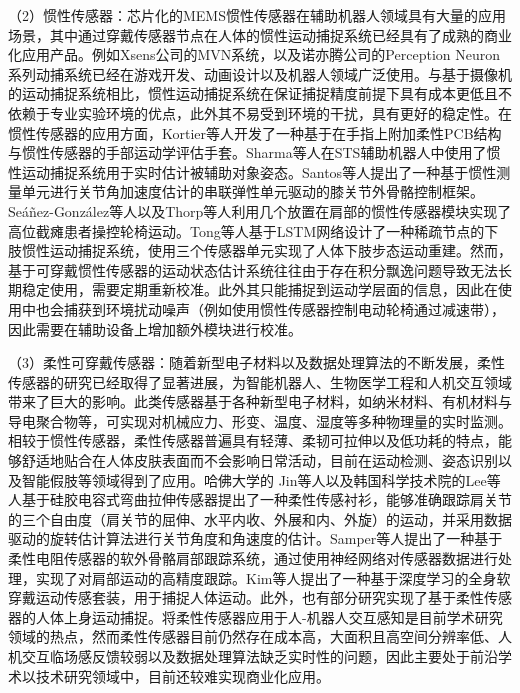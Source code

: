 （2）惯性传感器：芯片化的MEMS惯性传感器在辅助机器人领域具有大量的应用场景，其中通过穿戴传感器节点在人体的惯性运动捕捉系统已经具有了成熟的商业化应用产品。例如Xsens公司的MVN系统\cite{XsensProductsMovella}，以及诺亦腾公司的Perception Neuron系列\cite{NoitomNuoYiTengGuanWang}动捕系统已经在游戏开发、动画设计以及机器人领域广泛使用。与基于摄像机的运动捕捉系统相比，惯性运动捕捉系统在保证捕捉精度前提下具有成本更低且不依赖于专业实验环境的优点，此外其不易受到环境的干扰，具有更好的稳定性。在惯性传感器的应用方面，Kortier等人\cite{kortierAssessmentHandKinematics2014}开发了一种基于在手指上附加柔性PCB结构与惯性传感器的手部运动学评估手套。Sharma等人\cite{sharmaBiomechanicalTrajectoryOptimization2022,sharmaPhysicalHumanRobotInteraction2022}在STS辅助机器人中使用了惯性运动捕捉系统用于实时估计被辅助对象姿态。Santos等人\cite{dossantosIMUbasedTransparencyControl2022}提出了一种基于惯性测量单元进行关节角加速度估计的串联弹性单元驱动的膝关节外骨骼控制框架。Seáñez-González等人\cite{seanez-gonzalezStaticDynamicDecoding2017}以及Thorp等人\cite{thorpUpperBodyBasedPower2016d}利用几个放置在肩部的惯性传感器模块实现了高位截瘫患者操控轮椅运动。Tong等人\cite{tongLSTMBasedLowerLimbs2020}基于LSTM网络设计了一种稀疏节点的下肢惯性运动捕捉系统，使用三个传感器单元实现了人体下肢步态运动重建。然而，基于可穿戴惯性传感器的运动状态估计系统往往由于存在积分飘逸问题导致无法长期稳定使用，需要定期重新校准。此外其只能捕捉到运动学层面的信息，因此在使用中也会捕获到环境扰动噪声（例如使用惯性传感器控制电动轮椅通过减速带），因此需要在辅助设备上增加额外模块进行校准。

（3）柔性可穿戴传感器：随着新型电子材料以及数据处理算法的不断发展，柔性传感器的研究已经取得了显著进展，为智能机器人、生物医学工程和人机交互领域带来了巨大的影响。此类传感器基于各种新型电子材料，如纳米材料、有机材料与导电聚合物等，可实现对机械应力、形变、温度、湿度等多种物理量的实时监测。相较于惯性传感器，柔性传感器普遍具有轻薄、柔韧可拉伸以及低功耗的特点，能够舒适地贴合在人体皮肤表面而不会影响日常活动，目前在运动检测、姿态识别以及智能假肢等领域得到了应用。哈佛大学的 Jin等人\cite{jinSoftSensingShirt2020}以及韩国科学技术院的Lee等人\cite{leePrintableSkinAdhesive2016}基于硅胶电容式弯曲拉伸传感器提出了一种柔性传感衬衫，能够准确跟踪肩关节的三个自由度（肩关节的屈伸、水平内收、外展和内、外旋）的运动，并采用数据驱动的旋转估计算法进行关节角度和角速度的估计。Samper等人\cite{samper-escuderoEfficientMultiaxialShoulderMotion2020}提出了一种基于柔性电阻传感器的软外骨骼肩部跟踪系统，通过使用神经网络对传感器数据进行处理，实现了对肩部运动的高精度跟踪。Kim等人\cite{kimDeepFullBodyMotion2019}提出了一种基于深度学习的全身软穿戴运动传感套装，用于捕捉人体运动。此外，也有部分研究\cite{contreras-gonzalezEfficientUpperLimb2020,ogataEstimatingMovementsHuman2019}实现了基于柔性传感器的人体上身运动捕捉。将柔性传感器应用于人-机器人交互感知是目前学术研究领域的热点，然而柔性传感器目前仍然存在成本高，大面积且高空间分辨率低、人机交互临场感反馈较弱以及数据处理算法缺乏实时性的问题，因此主要处于前沿学术以技术研究领域中，目前还较难实现商业化应用。

